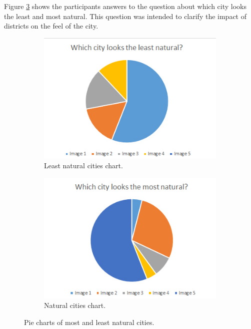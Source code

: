 	Figure \ref{fig:pie-chart-natural-least-natural} shows the participants answers to the question about which city looks the least and most natural. This question was intended to clarify the impact of districts on the feel of the city.
	
	\begin{figure}[h]
		\begin{subfigure}{0.5\textwidth}
			\centering
			\includegraphics[width=0.95\linewidth]{"Images/LeastNatural"}
			\caption{Least natural cities chart.}
			\label{fig:pie-chart-least-natural}
		\end{subfigure}
		\begin{subfigure}{0.5\textwidth}
			\centering
			\includegraphics[width=0.95\linewidth]{"Images/Natural"}
			\caption{Natural cities chart.}
			\label{fig:pie-chart-natural}
		\end{subfigure}
		\caption{Pie charts of most and least natural cities.}
		\label{fig:pie-chart-natural-least-natural}
	\end{figure}
	
